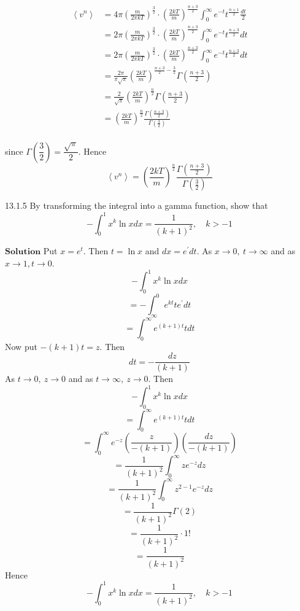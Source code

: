 $$
\begin{aligned}
\left\langle v^{n}\right\rangle&=4 \pi\left(\frac{m}{2 \pi k T}\right)^{\frac{3}{2}} \cdot\left(\frac{2 k T}{m}\right)^{\frac{n+3}{2}} \int_{0}^{\infty} e^{-t} t^{\frac{n+1}{2}} \frac{d t}{2} \\
&=2 \pi\left(\frac{m}{2 \pi k T}\right)^{\frac{3}{2}} \cdot\left(\frac{2 k T}{m}\right)^{\frac{n+3}{2}} \int_{0}^{\infty} e^{-t} t^{\frac{n+3}{2}} d t \\
&=2 \pi\left(\frac{m}{2 \pi k T}\right)^{\frac{3}{2}} \cdot\left(\frac{2 k T}{m}\right)^{\frac{n+3}{2}} \int_{0}^{\infty} e^{-t} t^{\frac{n+3}{2}} d t \\
&=\frac{2 \pi}{\pi \sqrt{\pi}}\left(\frac{2 k T}{m}\right)^{\frac{n+3}{2}-\frac{3}{2}} \Gamma\left(\frac{n+3}{2}\right) \\
&=\frac{2}{\sqrt{\pi}}\left(\frac{2 k T}{m}\right)^{\frac{n}{2}} \Gamma\left(\frac{n+3}{2}\right) \\
&=\left(\frac{2 k T}{m}\right)^{\frac{n}{2}} \frac{\Gamma\left(\frac{n+3}{2}\right)}{\Gamma\left(\frac{3}{2}\right)} \\
\end{aligned}
$$


since $\Gamma\left(\dfrac{3}{2}\right)=\dfrac{\sqrt{\pi}}{2}$. Hence 
$$\left\langle v^{n}\right\rangle=\left(\dfrac{2 k T}{m}\right)^{\frac{n}{2}} \frac{\Gamma\left(\frac{n+3}{2}\right)}{\Gamma\left(\frac{3}{2}\right)}$$

\newpage


\begin{mybox}{13.1.5}
By transforming the integral into a gamma function, show that
$$
-\int_{0}^{1} x^{k} \ln x d x=\frac{1}{(k+1)^{2}}, \quad k>-1
$$
\end{mybox}

$\boxed{\textbf{Solution}}$ Put $x=e^{t} .$ Then $t=\ln x$ and $d x=e^{\prime} d t$. As $x \rightarrow 0, \  t \rightarrow \infty$ and as $x \rightarrow 1, t \rightarrow 0$.
$$-\int_{0}^{1} x^{k} \ln x d x$$
$$=-\int_{\infty}^{0} e^{k t} t e^{\prime} d t$$
$$=\int_{0}^{\infty} e^{(k+1) t} t d t$$
Now put $-(k+1) t=z .$ Then 
$$d t=-\frac{d z}{(k+1)} $$
As $t \rightarrow 0, \  z \rightarrow 0$ and as $t \rightarrow \infty, \  z \rightarrow 0$. Then
$$-\int_{0}^{1} x^{k} \ln x d x$$
$$=\int_{0}^{\infty} e^{(k+1) t} t d t$$
$$=\int_{0}^{\infty} e^{-z}\left(\frac{z}{-(k+1)}\right)\left(\frac{d z}{-(k+1)}\right)$$
$$=\frac{1}{(k+1)^{2}} \int_{0}^{\infty} z e^{-z} d z$$
$$=\frac{1}{(k+1)^{2}} \int_{0}^{\infty} z^{2-1} e^{-z} d z$$
$$=\frac{1}{(k+1)^{2}} \Gamma(2)$$
$$=\frac{1}{(k+1)^{2}} \cdot 1 !$$
$$=\frac{1}{(k+1)^{2}}$$
Hence
$$
-\int_{0}^{1} x^{k} \ln x d x=\frac{1}{(k+1)^{2}}, \quad k>-1
$$

